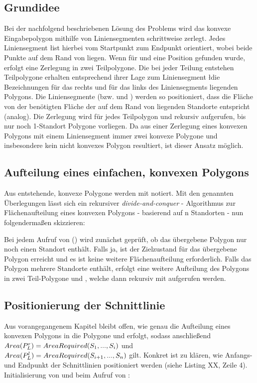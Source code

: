 \documentclass[ngerman]{seminarbeitrag}
\begin{document}
\subsection{Grundidee}\label{grundidee konvex}
Bei der nachfolgend beschriebenen Lösung des Problems wird das konvexe Eingabepolygon \cp mithilfe von Liniensegmenten schrittweise zerlegt. Jedes Liniensegment
\l ist hierbei vom Startpunkt \ls zum Endpunkt \Le orientiert, wobei beide Punkte auf dem Rand von \cp liegen. Wenn für \ls und \Le eine Position gefunden wurde, erfolgt eine
Zerlegung in zwei Teilpolygone.
Die bei jeder Teilung entstehen Teilpolygone erhalten entsprechend ihrer Lage zum Liniensegment \l die Bezeichnungen \prl für das rechts und \pll für das links
des Liniensegments liegenden Polygons. Die Liniensegmente (bzw. \ls und \Le) werden so positioniert, dass die Fläche von \prl der benötigten Fläche der auf dem Rand von \prl
liegenden Standorte entspricht (\pll analog). Die Zerlegung wird für jedes Teilpolygon \prl und \pll rekursiv aufgerufen, bis nur noch 1-Standort Polygone vorliegen. Da aus einer
Zerlegung eines konvexen Polygons mit einem Liniensegment immer zwei konvexe Polygone und insbesondere kein nicht konvexes Polygon resultiert, ist dieser Ansatz möglich.

\subsection{Aufteilung eines einfachen, konvexen Polygons}\label{aufteilung konvex}
Aus \cp entstehende, konvexe Polygone werden mit \cpi notiert. Mit den genannten Überlegungen lässt sich ein rekursiver \emph{divide-and-conquer} - Algorithmus
zur Flächenaufteilung eines konvexen Polygons - basierend auf n Standorten - nun folgendermaßen skizzieren:


Bei jedem Aufruf von \con(\cp) wird zunächst geprüft, ob das übergebene Polygon nur noch einen Standort enthält. Falls ja, ist der Zielzustand für das
übergebene Polygon erreicht und es ist keine weitere Flächenaufteilung erforderlich. Falls das Polygon mehrere Standorte enthält, erfolgt eine weitere Aufteilung
des Polygons in zwei Teil-Polygone \prl und \pll, welche dann rekursiv mit \con aufgerufen werden.

\subsection{Positionierung der Schnittlinie}\label{schnittlinie konvex}
Aus vorangegangenem Kapitel bleibt offen, wie genau die Aufteilung eines konvexen Polygons \cp in die Polygone \prl und \pll erfolgt, sodass anschließend
$Area(P_{L}^{r})=AreaRequired(S_{1},...,S_{i})$ und $Area(P_{L}^{l})=AreaRequired(S_{i+1},...,S_{n}) $ gilt.
Konkret ist zu klären, wie Anfangs- und Endpunkt der Schnittlinien positioniert werden (siehe Listing XX, Zeile 4). \\
Initialisierung von \ls und \Le beim Aufruf von \con:
\end{document}
